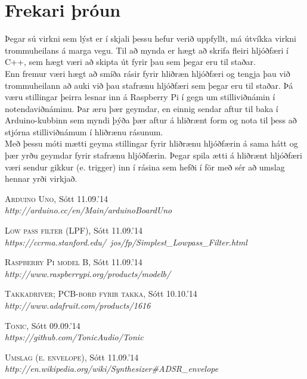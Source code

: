 \documentclass[a4paper,11pt,twocolumn]{article}
\begin{document}
\section{Frekari þróun}
Þegar sú virkni sem lýst er í skjali þessu hefur verið uppfyllt, má útvíkka virkni trommuheilans á marga vegu. Til að mynda er hægt að skrifa fleiri hljóðfæri í C++, sem hægt væri að skipta út fyrir þau sem þegar eru til staðar.\\
\indent Enn fremur væri hægt að smíða rásir fyrir hliðræn hljóðfæri og tengja þau við trommuheilann að auki við þau stafrænu hljóðfæri sem þegar eru til staðar. Þá væru stillingar þeirra lesnar inn á Raspberry Pi í gegn um stilliviðnámin í notendaviðnáminu. Þar æru þær geymdar, en einnig sendar aftur til baka í Arduino-kubbinn sem myndi þýða þær aftur á hliðrænt form og nota til þess að stjórna stilliviðnámum í hliðrænu rásunum.\\
\indent Með þessu móti mætti geyma stillingar fyrir hliðrænu hljóðfærin á sama hátt og þær yrðu geymdar fyrir stafrænu hljóðfærin. Þegar spila ætti á hliðrænt hljóðfæri væri sendur gikkur (e. trigger) inn í rásina sem hefði í för með sér að umslag hennar yrði virkjað.

\begin{thebibliography}{11}
\small

\textsc{Arduino Uno,} Sótt 11.09.'14\\
\emph{http://arduino.cc/en/Main/arduinoBoardUno}

\textsc{Low pass filter (LPF),} Sótt 11.09.'14\\
\emph{https://ccrma.stanford.edu/~jos/fp/Simplest\_Lowpass\_Filter.html}

\textsc{Raspberry Pi model B,} Sótt 11.09.'14\\
\emph{http://www.raspberrypi.org/products/model\-b/}

\textsc{Takkadriver; PCB-borð fyrir takka, } Sótt 10.10.'14\\
\emph{http://www.adafruit.com/products/1616}

\textsc{Tonic,} Sótt 09.09.'14\\
\emph{https://github.com/TonicAudio/Tonic}

\textsc{Umslag (e. envelope),} Sótt 11.09.'14\\
\emph{http://en.wikipedia.org/wiki/Synthesizer\#ADSR\_envelope}




\end{thebibliography}
\end{document}
